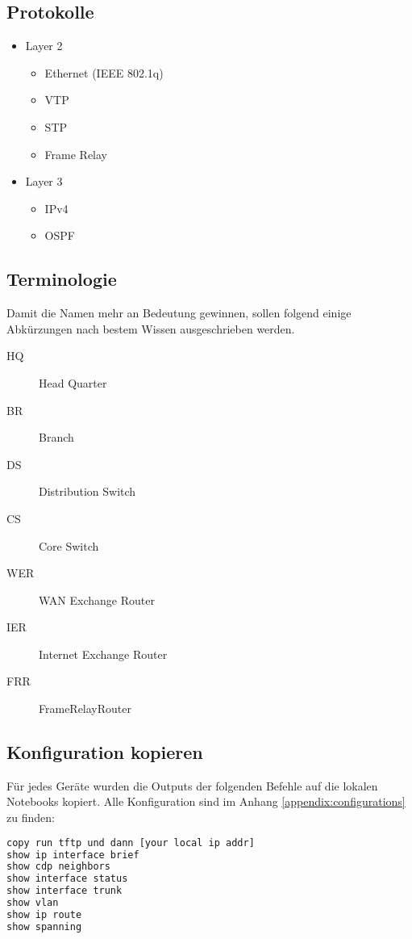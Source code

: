 \subsection{Protokolle}
\begin{multicols}{2}
\begin{itemize}
	\item Layer 2
	\begin{itemize}
		\item Ethernet (IEEE 802.1q)
		\item VTP
		\item STP
		\item Frame Relay
	\end{itemize}
	\item Layer 3
	\begin{itemize}
		\item IPv4
		\item OSPF
	\end{itemize}
\end{itemize}
\end{multicols}

\subsection{Terminologie}
Damit die Namen mehr an Bedeutung gewinnen, sollen folgend einige Abkürzungen nach bestem Wissen ausgeschrieben werden.
\begin{multicols}{2}
\begin{description}
	\item[HQ] Head Quarter
	\item[BR] Branch
	\item[DS] Distribution Switch
	\item[CS] Core Switch
	\item[WER] WAN Exchange Router
	\item[IER] Internet Exchange Router
	\item[FRR] FrameRelayRouter
\end{description}
\end{multicols}

\subsection{Konfiguration kopieren}
Für jedes Geräte wurden die Outputs der folgenden Befehle auf die lokalen Notebooks kopiert. Alle Konfiguration sind im Anhang \ref{appendix:configurations} zu finden:
\begin{lstlisting}[language=bash]
copy run tftp und dann [your local ip addr]
show ip interface brief
show cdp neighbors
show interface status
show interface trunk
show vlan
show ip route
show spanning
\end{lstlisting}

